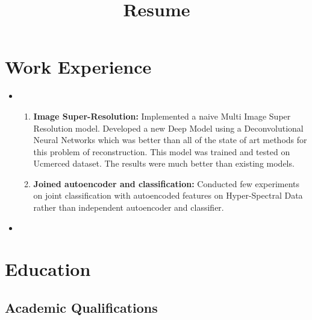 \documentclass[11pt,a4paper,sans]{moderncv}        %
\title{Resume}                               %
\begin{document}
\makecvtitle


\section{Work Experience}

\vspace{4pt}

\begin{itemize}

	\item{} \begin{enumerate}
			 \item \textbf{Image Super-Resolution:}
				 Implemented a naive Multi Image Super Resolution model.
				 Developed a new Deep Model using a Deconvolutional Neural
				 Networks which was better than all of the state of art methods
				 for
				 this problem of reconstruction. This model was trained and tested on Ucmerced dataset. The results were much
				 better than existing models.
			\vspace{3pt}
			 \item \textbf{Joined autoencoder and classification:}
					 Conducted few experiments on joint classification with
					 autoencoded features on Hyper-Spectral Data rather than independent autoencoder and classifier.
		\end{enumerate}
	\vspace{3pt}	
\item{}
\vspace{3pt}


\end{itemize}

\section{Education}

\vspace{3pt}

\subsection{Academic Qualifications}
\end{document}

